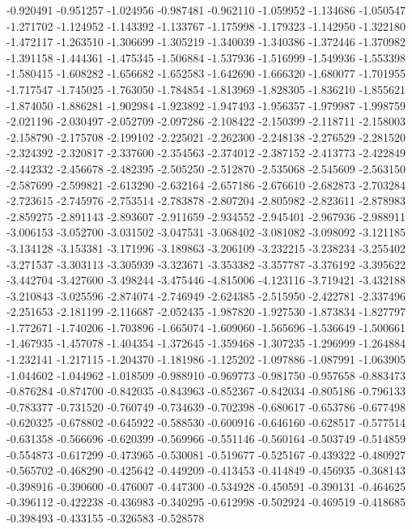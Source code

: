 -0.920491
-0.951257
-1.024956
-0.987481
-0.962110
-1.059952
-1.134686
-1.050547
-1.271702
-1.124952
-1.143392
-1.133767
-1.175998
-1.179323
-1.142950
-1.322180
-1.472117
-1.263510
-1.306699
-1.305219
-1.340039
-1.340386
-1.372446
-1.370982
-1.391158
-1.444361
-1.475345
-1.506884
-1.537936
-1.516999
-1.549936
-1.553398
-1.580415
-1.608282
-1.656682
-1.652583
-1.642690
-1.666320
-1.680077
-1.701955
-1.717547
-1.745025
-1.763050
-1.784854
-1.813969
-1.828305
-1.836210
-1.855621
-1.874050
-1.886281
-1.902984
-1.923892
-1.947493
-1.956357
-1.979987
-1.998759
-2.021196
-2.030497
-2.052709
-2.097286
-2.108422
-2.150399
-2.118711
-2.158003
-2.158790
-2.175708
-2.199102
-2.225021
-2.262300
-2.248138
-2.276529
-2.281520
-2.324392
-2.320817
-2.337600
-2.354563
-2.374012
-2.387152
-2.413773
-2.422849
-2.442332
-2.456678
-2.482395
-2.505250
-2.512870
-2.535068
-2.545609
-2.563150
-2.587699
-2.599821
-2.613290
-2.632164
-2.657186
-2.676610
-2.682873
-2.703284
-2.723615
-2.745976
-2.753514
-2.783878
-2.807204
-2.805982
-2.823611
-2.878983
-2.859275
-2.891143
-2.893607
-2.911659
-2.934552
-2.945401
-2.967936
-2.988911
-3.006153
-3.052700
-3.031502
-3.047531
-3.068402
-3.081082
-3.098092
-3.121185
-3.134128
-3.153381
-3.171996
-3.189863
-3.206109
-3.232215
-3.238234
-3.255402
-3.271537
-3.303113
-3.305939
-3.323671
-3.353382
-3.357787
-3.376192
-3.395622
-3.442704
-3.427600
-3.498244
-3.475446
-4.815006
-4.123116
-3.719421
-3.432188
-3.210843
-3.025596
-2.874074
-2.746949
-2.624385
-2.515950
-2.422781
-2.337496
-2.251653
-2.181199
-2.116687
-2.052435
-1.987820
-1.927530
-1.873834
-1.827797
-1.772671
-1.740206
-1.703896
-1.665074
-1.609060
-1.565696
-1.536649
-1.500661
-1.467935
-1.457078
-1.404354
-1.372645
-1.359468
-1.307235
-1.296999
-1.264884
-1.232141
-1.217115
-1.204370
-1.181986
-1.125202
-1.097886
-1.087991
-1.063905
-1.044602
-1.044962
-1.018509
-0.988910
-0.969773
-0.981750
-0.957658
-0.883473
-0.876284
-0.874700
-0.842035
-0.843963
-0.852367
-0.842034
-0.805186
-0.796133
-0.783377
-0.731520
-0.760749
-0.734639
-0.702398
-0.680617
-0.653786
-0.677498
-0.620325
-0.678802
-0.645922
-0.588530
-0.600916
-0.646160
-0.628517
-0.577514
-0.631358
-0.566696
-0.620399
-0.569966
-0.551146
-0.560164
-0.503749
-0.514859
-0.554873
-0.617299
-0.473965
-0.530081
-0.519677
-0.525167
-0.439322
-0.480927
-0.565702
-0.468290
-0.425642
-0.449209
-0.413453
-0.414849
-0.456935
-0.368143
-0.398916
-0.390600
-0.476007
-0.447300
-0.534928
-0.450591
-0.390131
-0.464625
-0.396112
-0.422238
-0.436983
-0.340295
-0.612998
-0.502924
-0.469519
-0.418685
-0.398493
-0.433155
-0.326583
-0.528578
